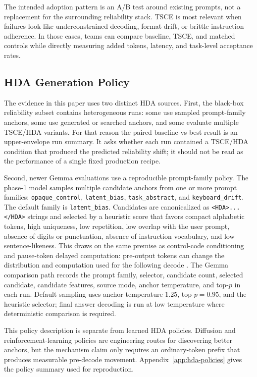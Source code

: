 \documentclass[11pt]{article}
\newcommand{\tsce}{\textsc{TSCE}}
\newcommand{\hda}{\textsc{HDA}}
\begin{document}
The intended adoption pattern is an A/B test around existing prompts, not a replacement for the surrounding reliability stack. \tsce{} is most relevant when failures look like underconstrained decoding, format drift, or brittle instruction adherence. In those cases, teams can compare baseline, \tsce{}, and matched controls while directly measuring added tokens, latency, and task-level acceptance rates.

\subsection{HDA Generation Policy}

The evidence in this paper uses two distinct \hda{} sources. First, the black-box reliability subset contains heterogeneous runs: some use sampled prompt-family anchors, some use generated or searched anchors, and some evaluate multiple \tsce{}/\hda{} variants. For that reason the paired baseline-vs-best result is an upper-envelope run summary. It asks whether each run contained a \tsce{}/\hda{} condition that produced the predicted reliability shift; it should not be read as the performance of a single fixed production recipe.

Second, newer Gemma evaluations use a reproducible prompt-family policy. The phase-1 model samples multiple candidate anchors from one or more prompt families: \texttt{opaque\_control}, \texttt{latent\_bias}, \texttt{task\_abstract}, and \texttt{keyboard\_drift}. The default family is \texttt{latent\_bias}. Candidates are canonicalized as \texttt{<HDA>...</HDA>} strings and selected by a heuristic score that favors compact alphabetic tokens, high uniqueness, low repetition, low overlap with the user prompt, absence of digits or punctuation, absence of instruction vocabulary, and low sentence-likeness. This draws on the same premise as control-code conditioning and pause-token delayed computation: pre-output tokens can change the distribution and computation used for the following decode \cite{control-codes,pause-tokens}. The Gemma comparison path records the prompt family, selector, candidate count, selected candidate, candidate features, source mode, anchor temperature, and top-$p$ in each run. Default sampling uses anchor temperature $1.25$, top-$p=0.95$, and the heuristic selector; final answer decoding is run at low temperature where deterministic comparison is required.

This policy description is separate from learned \hda{} policies. Diffusion and reinforcement-learning policies are engineering routes for discovering better anchors, but the mechanism claim only requires an ordinary-token prefix that produces measurable pre-decode movement. Appendix~\ref{app:hda-policies} gives the policy summary used for reproduction.
\end{document}
